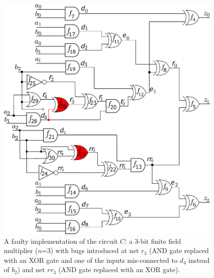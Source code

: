 \begin{figure}[hbt]
    \begin{center}
    \includegraphics[scale = 0.35]{mas_3_ddc_mfr_a.pdf}
    \end{center}
    \caption{{\footnotesize  
        A faulty implementation of the circuit $C$: a 3-bit finite
        field multiplier ($n$=3) with bugs introduced at net $r_3$
        (AND gate replaced with an XOR gate and one of the inputs
        mis-connected to $d_4$ instead of $b_2$) and net $rr_3$ (AND gate
        replaced with an XOR gate).}}  
    \label{fig:mas_bug_W}
\end{figure}

